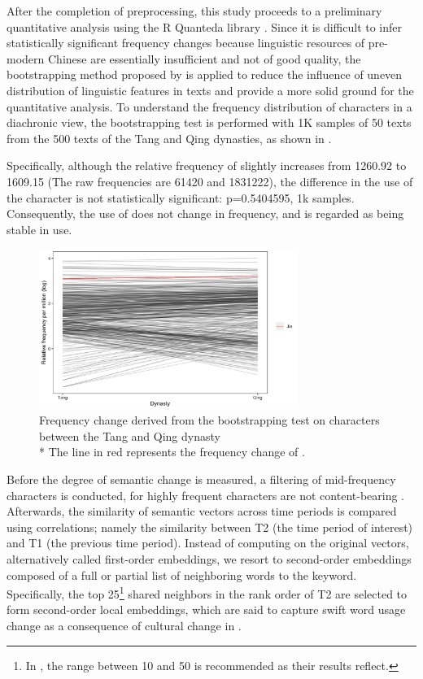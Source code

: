 After the completion of preprocessing, this study proceeds to a preliminary quantitative analysis using the R Quanteda library \parencite{quanteda}. Since it is difficult to infer statistically significant frequency changes because linguistic resources of pre-modern Chinese are essentially insufficient and not of good quality, the bootstrapping method proposed by \textcite{lijffijt2016bootstrap} is applied to reduce the influence of uneven distribution of linguistic features in texts and provide a more solid ground for the quantitative analysis. To understand the frequency distribution of characters in a diachronic view, the bootstrapping test is performed with 1K samples of 50 texts from the 500 texts of the Tang and Qing dynasties, as shown in . 

Specifically, although the relative frequency of \jia slightly increases from \num{1260.92} to \num{1609.15} (The raw frequencies are \num{61420} and \num{1831222}), the difference in the use of the character is not statistically significant: p=0.5404595, 1k samples. Consequently, the use of \jia does not change in frequency, and is regarded as being stable in use.

\begin{figure}[H]
\centering
\includegraphics[width=0.75\textwidth,keepaspectratio]{figures/Tang_Qing}
\caption{Frequency change derived from the bootstrapping test on characters between the Tang and Qing dynasty\\\footnotesize{* The line in red represents the frequency change of \jia\rspace.}}
\label{fig:freq_boot}
\end{figure}

Before the degree of semantic change is measured, a filtering of mid-frequency
characters is conducted, for highly frequent characters are not content-bearing \parencite{hamilton2016cultural,rodda2017panta}. Afterwards, the similarity of semantic vectors across time
periods is compared using correlations; namely the similarity between T2 (the time period of
interest) and T1 (the previous time period). Instead of computing on the original vectors,
alternatively called first-order embeddings, we resort to second-order embeddings composed
of a full or partial list of neighboring words to the keyword. Specifically, the top 25\footnote{In \textcite{hamilton2016cultural}, the range between 10 and 50 is recommended as their results reflect.} shared
neighbors in the rank order of T2 are selected to form second-order local embeddings, which
are said to capture swift word usage change as a consequence of cultural change in \textcite{hamilton2016cultural}.


